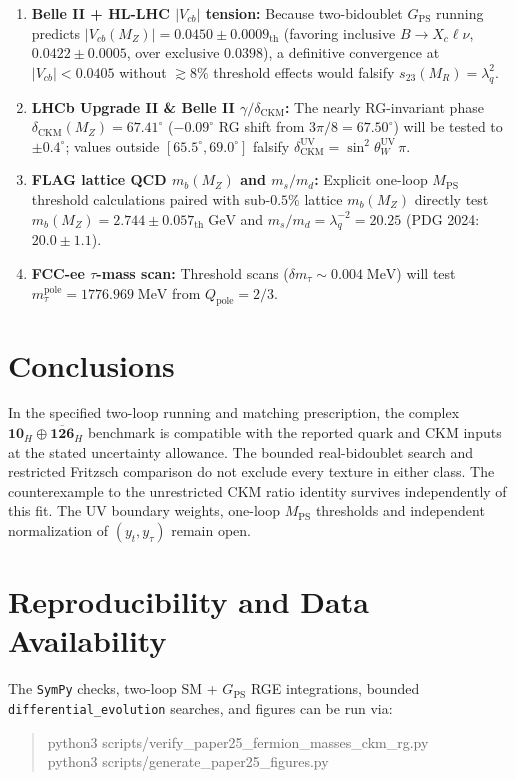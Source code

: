 \documentclass[11pt,a4paper]{article}
\begin{document}
\begin{enumerate}[label=(\arabic*),leftmargin=1.8em,itemsep=2pt]
\item \textbf{Belle II + HL-LHC $|V_{cb}|$ tension:} Because two-bidoublet $G_{\mathrm{PS}}$ running predicts $|V_{cb}(M_Z)| = 0.0450 \pm 0.0009_{\mathrm{th}}$ (favoring inclusive $B \to X_c \ell\nu$, $0.0422 \pm 0.0005$, over exclusive $0.0398$), a definitive convergence at $|V_{cb}| < 0.0405$ without $\gtrsim 8\%$ threshold effects would falsify $s_{23}(M_R) = \lambda_q^2$.
\item \textbf{LHCb Upgrade II \& Belle II $\gamma / \delta_{\mathrm{CKM}}$:} The nearly RG-invariant phase $\delta_{\mathrm{CKM}}(M_Z) = 67.41^\circ$ ($-0.09^\circ$ RG shift from $3\pi/8 = 67.50^\circ$) will be tested to $\pm 0.4^\circ$; values outside $[65.5^\circ, 69.0^\circ]$ falsify $\delta_{\mathrm{CKM}}^{\mathrm{UV}} = \sin^2\theta_W^{\mathrm{UV}}\,\pi$.
\item \textbf{FLAG lattice QCD $m_b(M_Z)$ and $m_s/m_d$:} Explicit one-loop $M_{\mathrm{PS}}$ threshold calculations paired with sub-$0.5\%$ lattice $m_b(M_Z)$ directly test $m_b(M_Z) = 2.744 \pm 0.057_{\mathrm{th}}\;\mathrm{GeV}$ and $m_s/m_d = \lambda_q^{-2} = 20.25$ (PDG 2024: $20.0 \pm 1.1$).
\item \textbf{FCC-ee $\tau$-mass scan:} Threshold scans ($\delta m_\tau \sim 0.004\;\mathrm{MeV}$) will test $m_\tau^{\mathrm{pole}} = 1776.969\;\mathrm{MeV}$ from $Q_{\mathrm{pole}} = 2/3$.
\end{enumerate}

\section{Conclusions}
\label{sec:conclusions}

In the specified two-loop running and matching prescription, the complex
$\mathbf{10}_H \oplus \overline{\mathbf{126}}_H$ benchmark is compatible
with the reported quark and CKM inputs at the stated uncertainty allowance.
The bounded real-bidoublet search and restricted Fritzsch comparison do
not exclude every texture in either class. The counterexample to the
unrestricted CKM ratio identity survives independently of this fit.
The UV boundary weights, one-loop $M_{\mathrm{PS}}$ thresholds and
independent normalization of $(y_t,y_\tau)$ remain open.

\section*{Reproducibility and Data Availability}
The \texttt{SymPy} checks, two-loop SM + $G_{\mathrm{PS}}$ RGE integrations,
bounded \texttt{differential\_evolution} searches, and figures can be run via:
\begin{quote}\small\ttfamily
python3 scripts/verify\_paper25\_fermion\_masses\_ckm\_rg.py\\
python3 scripts/generate\_paper25\_figures.py
\end{quote}
\end{document}
